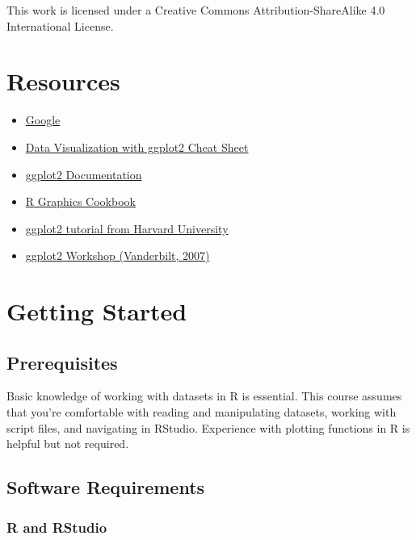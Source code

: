 \documentclass[]{article}
\theoremstyle{definition}
\theoremstyle{definition}
\theoremstyle{definition}
\theoremstyle{remark}
\begin{document}
This work is licensed under a Creative Commons Attribution-ShareAlike
4.0 International License.

\section{Resources}\label{resources}

\begin{itemize}
\item
  \href{http://www.google.com}{Google}
\item
  \href{https://www.rstudio.com/wp-content/uploads/2015/03/ggplot2-cheatsheet.pdf}{Data
  Visualization with ggplot2 Cheat Sheet}
\item
  \href{http://docs.ggplot2.org}{ggplot2 Documentation}
\item
  \href{https://ase.tufts.edu/bugs/guide/assets/R\%20Graphics\%20Cookbook.pdf}{R
  Graphics Cookbook}
\item
  \href{http://tutorials.iq.harvard.edu/R/Rgraphics/Rgraphics.html}{ggplot2
  tutorial from Harvard University}
\item
  \href{http://ggplot2.org/resources/2007-vanderbilt.pdf}{ggplot2
  Workshop (Vanderbilt, 2007)}
\end{itemize}

\section{Getting Started}\label{getting-started}

\subsection{Prerequisites}\label{prerequisites}

Basic knowledge of working with datasets in R is essential. This course
assumes that you're comfortable with reading and manipulating datasets,
working with script files, and navigating in RStudio. Experience with
plotting functions in R is helpful but not required.

\subsection{Software Requirements}\label{software-requirements}

\subsubsection{R and RStudio}\label{r-and-rstudio}
\end{document}
